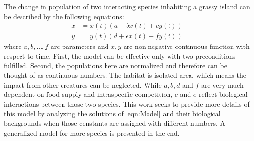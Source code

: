 The change in population of two interacting species inhabiting a grassy island can be described by the following equations:
\begin{equation}\label{eqn:Model}
\begin{aligned} 
\dot{x}&=x(t)(a+bx(t)+cy(t)) \\
\dot{y}&=y(t)(d+ex(t)+fy(t))
\end{aligned}
\end{equation}
where $a, b, ... ,f$ are parameters and $x, y$ are non-negative continuous function with respect to time. First, the model can be effective only with two preconditions fulfilled. Second, the populations here are normalized and therefore can be thought of as continuous numbers. The habitat is isolated area, which means the impact from other creatures can be neglected. While $a, b, d$ and $f$ are very much dependent on food supply and intraspecific competition, $c$ and $e$ reflect biological interactions between those two species. This work seeks to provide more details of this model by analyzing the solutions of \eqref{eqn:Model} and their biological backgrounds when those constants are assigned with different numbers. A generalized model for more species is presented in the end.